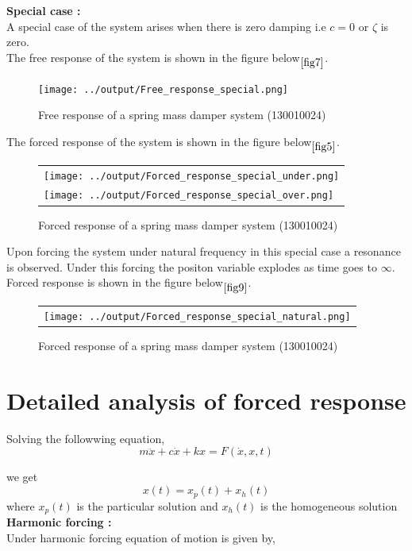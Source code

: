 \documentclass[11pt]{article}
\begin{document}
\newpage
\noindent\textbf{Special case :} \\
A special case of the system arises when there is zero damping i.e $c = 0$ or $\zeta$ is zero. \\
The free response of the system is shown in the figure below$\phantom{}_{\ref{fig7}}$.

\begin{figure}[H]
	\centering
	\centering
	\texttt{[image: ../output/Free\_response\_special.png]}
	\caption{Free response of a spring mass damper system (130010024)}
\end{figure}
\label{fig7}

\newpage
The forced response of the system is shown in the figure below$\phantom{}_{\ref{fig5}}$.

\begin{figure}[H]
	\centering
	\begin{tabular} {l}
	\texttt{[image: ../output/Forced\_response\_special\_under.png]} \\
	\texttt{[image: ../output/Forced\_response\_special\_over.png]} 
	\end{tabular}
	\caption{Forced response of a spring mass damper system (130010024)}
\end{figure}
\label{fig8}

\newpage
\noindent Upon forcing the system under natural frequency in this special case a resonance is observed. Under this
forcing the positon variable explodes as time goes to $\infty$.\\
Forced response is shown in the figure below$\phantom{}_{\ref{fig9}}$.


\begin{figure}[H]
	\centering
	\begin{tabular} {l}
	\texttt{[image: ../output/Forced\_response\_special\_natural.png]} 
	\end{tabular}
	\caption{Forced response of a spring mass damper system (130010024)}
\end{figure}
\label{fig9} 




\section{Detailed analysis of forced response\cite{norman}}

Solving the followwing equation,
$$ m\ddot{x} + c\dot{x} + kx = F(\dot{x},x,t) $$

\noindent we get 
$$ x(t) = x_p(t) + x_h(t)$$
where $x_p(t)$ is the particular solution and $x_h(t)$ is the homogeneous solution\\
\hfill \break
\noindent\textbf{Harmonic forcing :} \\
\noindent Under harmonic forcing equation of motion is given by,
\end{document}
